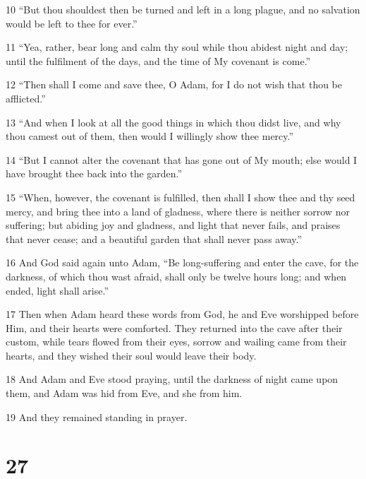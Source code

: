 \par 10 “But thou shouldest then be turned and left in a long plague, and no salvation would be left to thee for ever.”

\par 11 “Yea, rather, bear long and calm thy soul while thou abidest night and day; until the fulfilment of the days, and the time of My covenant is come.”

\par 12 “Then shall I come and save thee, O Adam, for I do not wish that thou be afflicted.”

\par 13 “And when I look at all the good things in which thou didst live, and why thou camest out of them, then would I willingly show thee mercy.”

\par 14 “But I cannot alter the covenant that has gone out of My mouth; else would I have brought thee back into the garden.”

\par 15 “When, however, the covenant is fulfilled, then shall I show thee and thy seed mercy, and bring thee into a land of gladness, where there is neither sorrow nor suffering; but abiding joy and gladness, and light that never fails, and praises that never cease; and a beautiful garden that shall never pass away.”

\par 16 And God said again unto Adam, “Be long-suffering and enter the cave, for the darkness, of which thou wast afraid, shall only be twelve hours long; and when ended, light shall arise.”

\par 17 Then when Adam heard these words from God, he and Eve worshipped before Him, and their hearts were comforted. They returned into the cave after their custom, while tears flowed from their eyes, sorrow and wailing came from their hearts, and they wished their soul would leave their body.

\par 18 And Adam and Eve stood praying, until the darkness of night came upon them, and Adam was hid from Eve, and she from him.

\par 19 And they remained standing in prayer.

\chapter{27}

